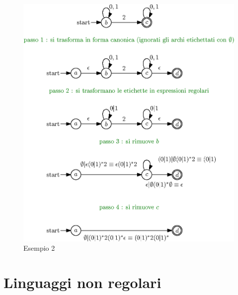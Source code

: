 \documentclass[10pt, letterpaper]{report}
\begin{document}
\begin{center}
    \begin{figure}[h!]
        \centering 
        \includegraphics[width=1\textwidth ]{images/esempio2Regex.eps}
        \caption{Esempio 2}
        \label{fig:es2Regex}
    \end{figure}
\end{center}\flowerLine \newpage 
\section{Linguaggi non regolari}
\end{document}
